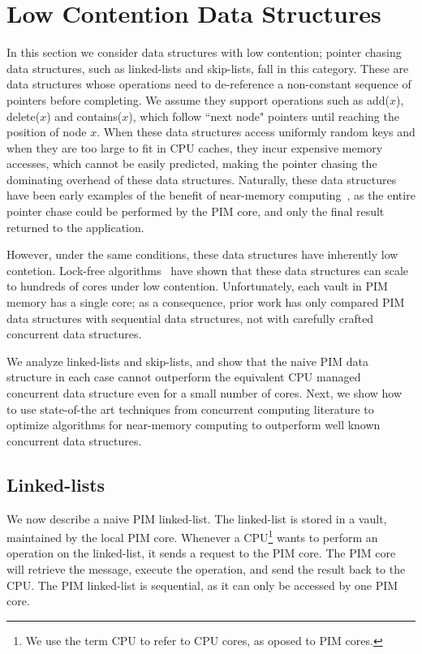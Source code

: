 
\section{Low Contention Data Structures}
\label{section:pointer_chasing}

In this section we consider data structures with low contention; pointer chasing data structures, 
such as linked-lists and skip-lists, fall in this category.  
These are data structures whose operations  
need to de-reference a non-constant sequence of pointers before completing. We assume they support operations 
such as add($x$), delete($x$) and contains($x$), which follow ``next node" pointers until 
reaching the position of node $x$.
When these data structures access uniformly random keys and when they are too large to fit in CPU caches, 
they incur expensive memory accesses, which cannot
be easily predicted, making the pointer chasing the dominating overhead of these data structures.
Naturally, these data structures have been early examples of the benefit of near-memory 
computing~\cite{}, as the entire pointer chase could be performed by the PIM core, and only the final result returned to 
the application. 

However, under the same conditions, these data structures have inherently low contetion. Lock-free algorithms~\cite{}
have shown that these data structures can scale to hundreds of cores under low contention. Unfortunately, each vault in 
PIM memory has a single core; as a consequence, prior work 
has only compared PIM data structures with sequential data structures, 
not with carefully crafted concurrent data structures.

We analyze linked-lists and skip-lists, and show that the naive PIM data structure in each case cannot 
outperform the equivalent CPU managed concurrent data structure even for a small number of cores. Next, 
we show how to use state-of-the art techniques from concurrent computing literature to 
optimize algorithms for near-memory computing to outperform well known concurrent data 
structures. 

\subsection{Linked-lists}
\label{section:linked_list}
We now describe a naive PIM linked-list.
The linked-list is stored in a vault, maintained by the local PIM core.
Whenever a CPU\footnote{We use the term CPU to refer to CPU cores, as oposed to PIM cores.} 
wants to perform an operation on the linked-list,
it sends a request to the PIM core.
The PIM core will retrieve the message, execute the operation, and send the result back to the CPU.
The PIM linked-list is sequential, as it can only be accessed by one PIM core. 

